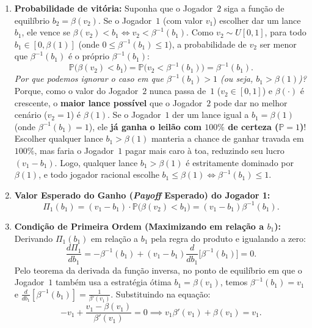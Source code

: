 \begin{enumerate}[label=\arabic*.]
    \item \textbf{Probabilidade de vitória:} Suponha que o Jogador~$2$ siga a função de equilíbrio $b_2 = \beta(v_2)$. Se o Jogador~$1$ (com valor $v_1$) escolher dar um lance $b_1$, ele vence se $\beta(v_2) < b_1 \iff v_2 < \beta^{-1}(b_1)$. Como $v_2 \sim U[0, 1]$, para todo $b_1 \in [0, \beta(1)]$ (onde $0 \le \beta^{-1}(b_1) \le 1$), a probabilidade de $v_2$ ser menor que $\beta^{-1}(b_1)$ é o próprio $\beta^{-1}(b_1)$:
    \begin{equation}
    \mathbb{P}\big(\beta(v_2) < b_1\big) = \mathbb{P}\big(v_2 < \beta^{-1}(b_1)\big) = \beta^{-1}(b_1).
    \end{equation}
    \textit{Por que podemos ignorar o caso em que $\beta^{-1}(b_1) > 1$ (ou seja, $b_1 > \beta(1)$)?} Porque, como o valor do Jogador~$2$ nunca passa de~$1$ ($v_2 \in [0, 1]$) e $\beta(\cdot)$ é crescente, o \textbf{maior lance possível} que o Jogador~$2$ pode dar no melhor cenário ($v_2 = 1$) é $\beta(1)$. Se o Jogador~$1$ der um lance igual a $b_1 = \beta(1)$ (onde $\beta^{-1}(b_1) = 1$), ele \textbf{já ganha o leilão com $100\%$ de certeza ($\mathbb{P} = 1$)}! Escolher qualquer lance $b_1 > \beta(1)$ manteria a chance de ganhar travada em $100\%$, mas faria o Jogador~$1$ pagar mais caro à toa, reduzindo seu lucro $(v_1 - b_1)$. Logo, qualquer lance $b_1 > \beta(1)$ é estritamente dominado por $\beta(1)$, e todo jogador racional escolhe $b_1 \le \beta(1) \iff \beta^{-1}(b_1) \le 1$.

    \item \textbf{Valor Esperado do Ganho (\textit{Payoff} Esperado) do Jogador 1:}
    \begin{equation}
    \Pi_1(b_1) = (v_1 - b_1)\cdot \mathbb{P}\big(\beta(v_2) < b_1\big) = (v_1 - b_1)\beta^{-1}(b_1).
    \end{equation}

    \item \textbf{Condição de Primeira Ordem (Maximizando em relação a $b_1$):} Derivando $\Pi_1(b_1)$ em relação a $b_1$ pela regra do produto e igualando a zero:
    \begin{equation}
    \frac{d\Pi_1}{db_1} = -\beta^{-1}(b_1) + (v_1 - b_1)\frac{d}{db_1}\!\big[\beta^{-1}(b_1)\big] = 0.
    \end{equation}
    Pelo teorema da derivada da função inversa, no ponto de equilíbrio em que o Jogador~$1$ também usa a estratégia ótima $b_1 = \beta(v_1)$, temos $\beta^{-1}(b_1) = v_1$ e $\frac{d}{db_1}[\beta^{-1}(b_1)] = \frac{1}{\beta'(v_1)}$. Substituindo na equação:
    \begin{equation}
    -v_1 + \frac{v_1 - \beta(v_1)}{\beta'(v_1)} = 0 \implies v_1 \beta'(v_1) + \beta(v_1) = v_1.
    \end{equation}


\end{enumerate}

